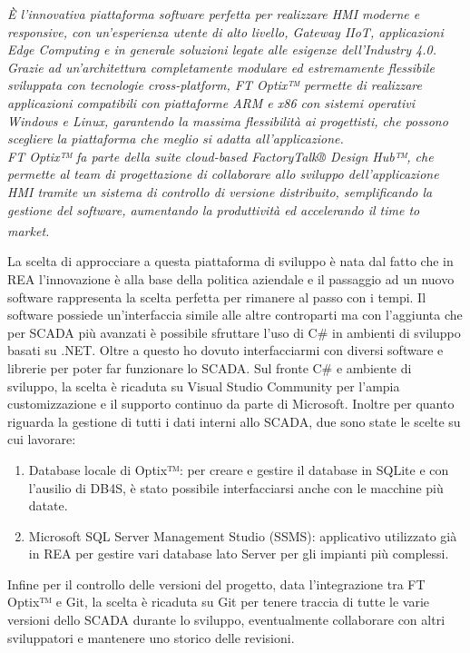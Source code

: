 \begin{displayquote}
    \textit{È l’innovativa piattaforma software perfetta per realizzare HMI moderne e responsive, con un’esperienza utente di alto livello, Gateway IIoT, applicazioni Edge Computing e in generale soluzioni legate alle esigenze dell’Industry 4.0.} \\ \textit{Grazie ad un’architettura completamente modulare ed estremamente flessibile sviluppata con tecnologie cross-platform, FT Optix™ permette di realizzare applicazioni compatibili con piattaforme ARM e x86 con sistemi operativi Windows e Linux, garantendo la massima flessibilità ai progettisti, che possono scegliere la piattaforma che meglio si adatta all’applicazione.} \\ \textit{FT Optix™ fa parte della suite cloud-based FactoryTalk® Design Hub™, che permette al team di progettazione di collaborare allo sviluppo dell’applicazione HMI tramite un sistema di controllo di versione distribuito, semplificando la gestione del software, aumentando la produttività ed accelerando il time to market.}\textsuperscript{\cite{asemautomation}}
\end{displayquote}

La scelta di approcciare a questa piattaforma di sviluppo è nata dal fatto che in REA l'innovazione è alla base della politica aziendale e il passaggio ad un nuovo software rappresenta la scelta perfetta per rimanere al passo con i tempi. Il software possiede un'interfaccia simile alle altre controparti ma con l'aggiunta che per SCADA più avanzati è possibile sfruttare l'uso di C\# in ambienti di sviluppo basati su .NET. Oltre a questo ho dovuto interfacciarmi con diversi software e librerie per poter far funzionare lo SCADA. 
Sul fronte C\# e ambiente di sviluppo, la scelta è ricaduta su Visual Studio Community per l'ampia customizzazione e il supporto continuo da parte di Microsoft. Inoltre per quanto riguarda la gestione di tutti i dati interni allo SCADA, due sono state le scelte su cui lavorare:
\begin{enumerate}
    \item Database locale di Optix™: per creare e gestire il database in SQLite e con l'ausilio di DB4S, è stato possibile interfacciarsi anche con le macchine più datate.
    \item Microsoft SQL Server Management Studio (SSMS): applicativo utilizzato già in REA per gestire vari database lato Server per gli impianti più complessi.
\end{enumerate}
Infine per il controllo delle versioni del progetto, data l'integrazione tra FT Optix™ e Git, la scelta è ricaduta su Git per tenere traccia di tutte le varie versioni dello SCADA durante lo sviluppo, eventualmente collaborare con altri sviluppatori e mantenere uno storico delle revisioni. 

